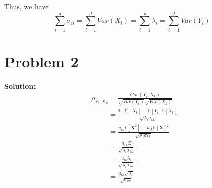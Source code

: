 \documentclass[11pt]{article}
\begin{document}
	Thus, we have
	\[\sum_{i = 1}^d \sigma_{ii} = \sum_{i = 1}^d Var(X_i) = \sum_{i = 1}^d \lambda_i = \sum_{i = 1}^d Var(Y_i)\]
\section*{Problem 2}
\textbf{Solution:} 
	\begin{align}
		&\rho_{Y_i, X_k} = \frac{Cov(Y_i, X_k)}{\sqrt{Var(Y_i)}\sqrt{Var(X_k)}}\nonumber\\
		&\phantom{\rho_{Y_i, X_k}} = \frac{\mathbb{E}[Y_i \cdot X_k] - \mathbb{E}[Y_i]\mathbb{E}[X_k]}{\sqrt{\lambda_i\sigma_{kk}}}\nonumber\\
		&\phantom{\rho_{Y_i, X_k}} = \frac{u_{ik} \mathbb{E}[\mathbf{X}^2] - u_{ik} \mathbb{E}[\mathbf{X}]^2}{\sqrt{\lambda_i\sigma_{kk}}}\nonumber\\
		&\phantom{\rho_{Y_i, X_k}} = \frac{u_{ik} \Sigma}{\sqrt{\lambda_i\sigma_{kk}}}\nonumber\\
		&\phantom{\rho_{Y_i, X_k}} = \frac{u_{ik} \lambda_i}{\sqrt{\lambda_i\sigma_{kk}}}\nonumber\\
		&\phantom{\rho_{Y_i, X_k}} = \frac{u_{ik} \sqrt{\lambda_i}}{\sqrt{\sigma_{kk}}}\nonumber
	\end{align}
\end{document}
